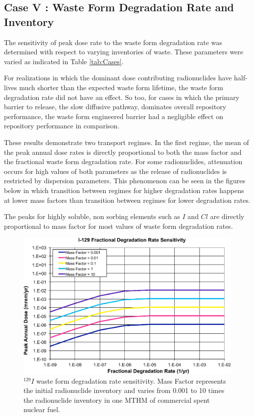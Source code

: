 
\subsection{Case V : Waste Form Degradation Rate and Inventory}

The sensitivity of peak dose rate to the waste form degradation rate was 
determined with respect to varying inventories of waste. These parameters were 
varied as indicated in Table \ref{tab:Cases}.

For realizations in which the dominant dose contributing 
radionuclides have half-lives much shorter than the expected waste form lifetime, 
the waste form degradation rate did not have an effect. So too, for 
cases in which the primary barrier to release, the slow diffusive pathway, 
dominates overall repository performance, the waste form engineered barrier
had a negligible effect on repository performance in comparison.

These results demonstrate two transport regimes. In the first regime, the mean 
of the peak annual dose rates is directly proportional to both the mass factor 
and the fractional waste form degradation rate. For some radionuclides, 
attenuation occurs for high values of both parameters as the release of 
radionuclides is restricted by dispersion parameters. This phenomenon can be seen 
in the figures below in which transition between regimes for higher degradation 
rates happens at lower mass factors than transition between regimes for lower 
degradation rates. 

The peaks for highly soluble, non sorbing elements such as $I$ and $Cl$
are directly proportional to mass factor for most 
values of waste form degradation rates. 

\begin{figure}[H]
  \centering
  \includegraphics[width=\linewidth]{I129_deg_rate.eps}
  \caption{$^{129}I$ waste form degradation rate sensitivity. Mass Factor 
represents the initial radionuclide inventory and varies from 0.001 to 10 times 
the radionuclide inventory in one \gls{MTHM} of commercial spent nuclear fuel.}
  \label{fig:WFDegI129}
\end{figure}

